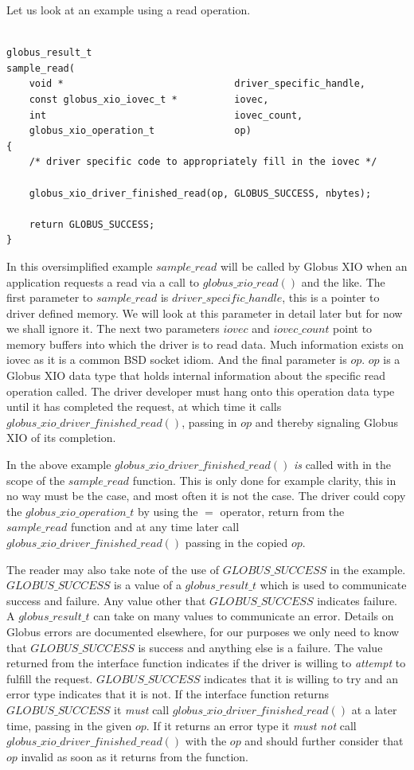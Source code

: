 \documentclass[11pt]{article}
\begin{document}
Let us look at an example using a read operation.

\begin{verbatim}

globus_result_t
sample_read(
    void *                              driver_specific_handle,
    const globus_xio_iovec_t *          iovec,
    int                                 iovec_count,
    globus_xio_operation_t              op)
{
    /* driver specific code to appropriately fill in the iovec */

    globus_xio_driver_finished_read(op, GLOBUS_SUCCESS, nbytes);

    return GLOBUS_SUCCESS;
}

\end{verbatim}

In this oversimplified example $sample\_read$ will be called
by Globus XIO when an application requests a read via a call to
$globus\_xio\_read()$ and the like.  The first parameter to
$sample\_read$ is $driver\_specific\_handle$, this is a pointer
to driver defined memory.  We will look at this parameter in detail
later but for now we shall ignore it.  The next two parameters 
$iovec$ and $iovec\_count$ point to memory buffers into which
the driver is to read data.  Much information exists on iovec as it 
is a common BSD socket idiom.  And the final parameter is $op$.
$op$ is a Globus XIO data type that holds internal information about
the specific read operation called.  The driver developer must 
hang onto this operation data type until it has completed the request,
at which time it calls $globus\_xio\_driver\_finished\_read()$, passing
in $op$ and thereby signaling Globus XIO of its completion.

In the above example $globus\_xio\_driver\_finished\_read()$ \emph{is} called
with in the scope of the $sample\_read$ function.  This is only done
for example clarity, this in no way must be the case, and most often
it is not the
case.  The driver could copy the $globus\_xio\_operation\_t$ by using
the $=$ operator, return from the $sample\_read$ function and at any time
later call $globus\_xio\_driver\_finished\_read()$ passing in the copied
$op$.

The reader may also take note of the use of $GLOBUS\_SUCCESS$ in the example.
$GLOBUS\_SUCCESS$ is a value of a $globus\_result\_t$ which is used to
communicate success and failure.  Any value other that $GLOBUS\_SUCCESS$
indicates failure.  A $globus\_result\_t$ can take on many values to
communicate an error.  Details on Globus errors are documented 
elsewhere, for our purposes we only need to know that $GLOBUS\_SUCCESS$ 
is success and anything else is a failure.
The value  returned from the interface function indicates
if the driver is willing to \emph{attempt} to fulfill the request.  
$GLOBUS\_SUCCESS$ indicates that it is willing to try and an error
type indicates that it is not.  
If the interface function returns $GLOBUS\_SUCCESS$
it \emph{must} call $globus\_xio\_driver\_finished\_read()$ at a later time, 
passing in the given $op$.  If it returns
an error type it \emph{must not} call $globus\_xio\_driver\_finished\_read()$
with the $op$ and should further consider that $op$ invalid as soon as it
returns from the function.
\end{document}
